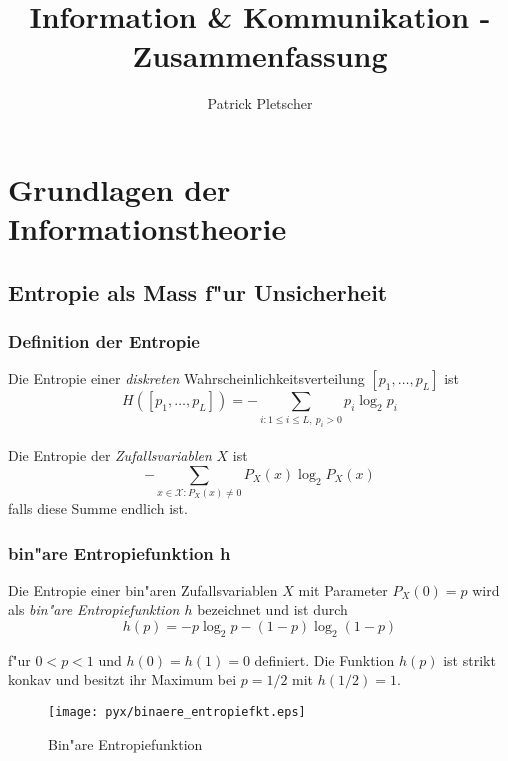 \documentclass[german, 10pt, a4paper, twocolumn]{scrartcl}
\title{Information \& Kommunikation - Zusammenfassung}
\author{Patrick Pletscher}
\begin{document}
\maketitle

\section{Grundlagen der Informationstheorie}

\subsection{Entropie als Mass f"ur Unsicherheit}

\subsubsection{Definition der Entropie}

Die Entropie einer \textit{diskreten} Wahrscheinlichkeitsverteilung $[p_1,\ldots,p_L]$ ist
\begin{displaymath}
	H([p_1,\ldots,p_L]) = - \sum_{i:1\leq i\leq L,\:p_i>0} p_i\log_2 p_i
\end{displaymath}\\

Die Entropie der \textit{Zufallsvariablen} $X$ ist
\begin{displaymath}
	- \sum_{x\in \mathcal{X}:P_X(x)\neq 0} P_X(x) \log_2 P_X(x)
\end{displaymath}
falls diese Summe endlich ist.\\


\subsubsection{bin"are Entropiefunktion h}

Die Entropie einer bin"aren Zufallsvariablen $X$ mit Parameter $P_X(0)=p$ wird als \textit{bin"are Entropiefunktion $h$} bezeichnet und ist durch
\begin{displaymath}
	h(p) = -p \log_2 p - (1-p)\log_2 (1-p)
\end{displaymath}

f"ur $0<p<1$ und $h(0)=h(1)=0$ definiert. Die Funktion $h(p)$ ist strikt konkav und besitzt ihr Maximum bei $p=1/2$ mit $h(1/2)=1$.

\begin{figure}[hbt]
	\begin{center}
		\texttt{[image: pyx/binaere\_entropiefkt.eps]}
	\end{center}
	\label{binaere_entropiefkt}
	\caption{Bin"are Entropiefunktion}
\end{figure}
\end{document}
